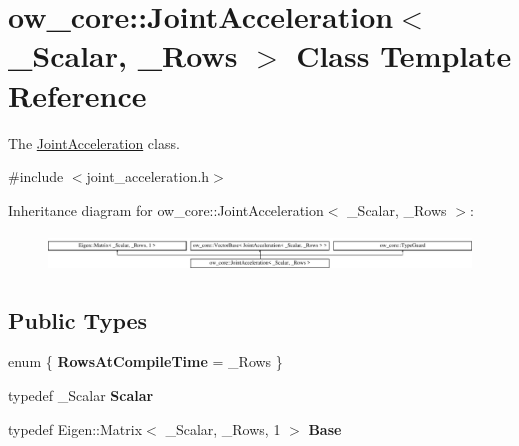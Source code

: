 \hypertarget{classow__core_1_1JointAcceleration}{}\section{ow\+\_\+core\+:\+:Joint\+Acceleration$<$ \+\_\+\+Scalar, \+\_\+\+Rows $>$ Class Template Reference}
\label{classow__core_1_1JointAcceleration}


The \hyperlink{classow__core_1_1JointAcceleration}{Joint\+Acceleration} class.  




{\ttfamily \#include $<$joint\+\_\+acceleration.\+h$>$}

Inheritance diagram for ow\+\_\+core\+:\+:Joint\+Acceleration$<$ \+\_\+\+Scalar, \+\_\+\+Rows $>$\+:\begin{figure}[H]
\begin{center}
\leavevmode
\includegraphics[height=0.987654cm]{d9/d9f/classow__core_1_1JointAcceleration}
\end{center}
\end{figure}
\subsection*{Public Types}
\begin{DoxyCompactItemize}
\item 
enum \{ {\bfseries Rows\+At\+Compile\+Time} = \+\_\+\+Rows
 \}\hypertarget{classow__core_1_1JointAcceleration_a6613ef593db1a3a6cb61019825893d72}{}\label{classow__core_1_1JointAcceleration_a6613ef593db1a3a6cb61019825893d72}

\item 
typedef \+\_\+\+Scalar {\bfseries Scalar}\hypertarget{classow__core_1_1JointAcceleration_a3aef897869dad7025edeffbc67d1bfd9}{}\label{classow__core_1_1JointAcceleration_a3aef897869dad7025edeffbc67d1bfd9}

\item 
typedef Eigen\+::\+Matrix$<$ \+\_\+\+Scalar, \+\_\+\+Rows, 1 $>$ {\bfseries Base}\hypertarget{classow__core_1_1JointAcceleration_ac90a97f96aaa032836b702e6ad972fe8}{}\label{classow__core_1_1JointAcceleration_ac90a97f96aaa032836b702e6ad972fe8}

\end{DoxyCompactItemize}
